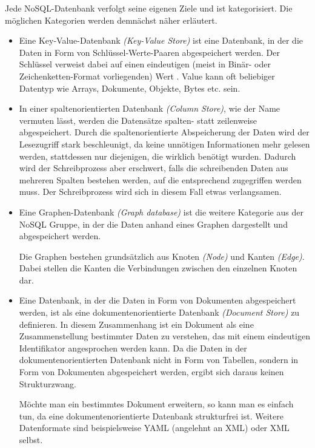 Jede NoSQL-Datenbank verfolgt seine eigenen Ziele und ist kategorisiert. Die möglichen Kategorien werden demnächst näher erläutert.

\begin{itemize}
\item Eine Key-Value-Datenbank \textit{(Key-Value Store)} ist eine Datenbank, in der die Daten in Form von Schlüssel-Werte-Paaren abgespeichert werden. Der Schlüssel verweist dabei auf einen eindeutigen (meist in Binär- oder Zeichenketten-Format vorliegenden) Wert \cite{nosql}. Value kann oft beliebiger Datentyp wie Arrays, Dokumente, Objekte, Bytes etc. sein.

\item In einer spaltenorientierten Datenbank \textit{(Column Store)}, wie der Name vermuten lässt, werden die Datensätze spalten- statt zeilenweise abgespeichert. Durch die spaltenorientierte Abspeicherung der Daten wird der Lesezugriff stark beschleunigt, da keine unnötigen Informationen mehr gelesen werden, stattdessen nur diejenigen, die wirklich benötigt wurden. Dadurch wird der Schreibprozess aber erschwert, falls die schreibenden Daten aus mehreren Spalten bestehen werden, auf die entsprechend zugegriffen werden muss. Der Schreibprozess wird sich in diesem Fall etwas verlangsamen.

\item Eine Graphen-Datenbank \textit{(Graph database)} ist die weitere Kategorie aus der NoSQL Gruppe, in der die Daten anhand eines Graphen dargestellt und abgespeichert werden.

Die Graphen bestehen grundsätzlich aus Knoten \textit{(Node)} und Kanten \textit{(Edge)}. Dabei stellen die Kanten die Verbindungen zwischen den einzelnen Knoten dar.

\item Eine Datenbank, in der die Daten in Form von Dokumenten abgespeichert werden, ist als eine dokumentenorientierte Datenbank \textit{(Document Store)} zu definieren. In diesem Zusammenhang ist ein Dokument als eine Zusammenstellung bestimmter Daten zu verstehen, das mit einem eindeutigen Identifikator angesprochen werden kann. Da die Daten in der dokumentenorientierten Datenbank nicht in Form von Tabellen, sondern in Form von Dokumenten abgespeichert werden, ergibt sich daraus keinen Strukturzwang.

Möchte man ein bestimmtes Dokument erweitern, so kann man es einfach tun, da eine dokumentenorientierte Datenbank strukturfrei ist. Weitere Datenformate sind beispielsweise YAML \cite{yaml} (angelehnt an XML) oder XML \cite{xml} selbst. 
\end{itemize}

